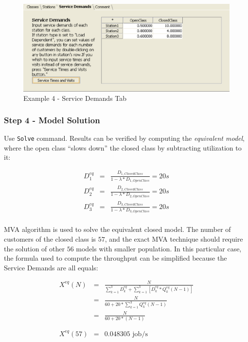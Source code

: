 \begin{figure}[htbp]
    \begin{center}
        \includegraphics[scale=.5]{img/jmva/example4Services}
    \end{center}
    \caption{Example 4 - Service Demands Tab}
    \label{fig:jmva:example4Services}
\end{figure}

\subsubsection{Step 4 - Model Solution}
Use \texttt{Solve} command. Results can be verified by computing the
\emph{equivalent model}, where the open class ``slows down'' the
closed class by subtracting utilization to it:

\begin{eqnarray*}
D_{1}^{eq}&=&\frac{D_{1,ClosedClass}}{1- \lambda * D_{1,OpenClass}} = 20 s\\
D_{2}^{eq}&=&\frac{D_{2,ClosedClass}}{1- \lambda * D_{2,OpenClass}} = 20 s\\
D_{3}^{eq}&=&\frac{D_{3,ClosedClass}}{1- \lambda * D_{3,OpenClass}} = 20 s\\
\end{eqnarray*}

MVA algorithm is used to solve the equivalent closed model. The
number of customers of the closed class is $57$, and the exact MVA
technique should require the solution of other $56$ models with
smaller population. In this particular case, the formula used to
compute the throughput can be simplified because the Service Demands
are all equals:

\begin{eqnarray*}
X^{eq}(N)&=&\frac{N}{\sum_{k=1}^{3} D_{k}^{eq} + \sum_{k=1}^{3}
\left[D_{k}^{eq}*Q_{k}^{eq}(N-1)\right]}\\
&=&\frac{N}{60 + 20*\sum_{k=1}^{3}
Q_{k}^{eq}(N-1)}\\
&=&\frac{N}{60 + 20*(N-1)}\\
\\
\\
X^{eq}(57)&=&0.048305 \textrm{ job/s}
\end{eqnarray*}

